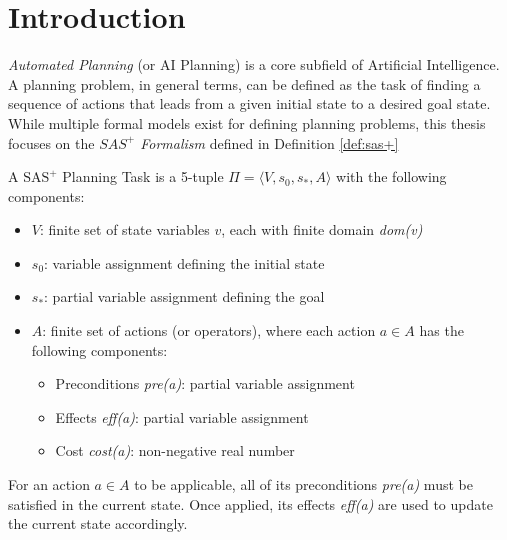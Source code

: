 \chapter{Introduction}
\label{ch:intro}
\textit{Automated Planning} (or AI Planning) is a core subfield of Artificial Intelligence.
A planning problem, in general terms, can be defined as the task of finding a sequence
of actions that leads from a given initial state to a desired goal state.
While multiple formal models exist for defining planning problems, this thesis
focuses on the \textit{$SAS^+$ Formalism} defined in Definition \ref{def:sas+}

\begin{definition}
	\label{def:sas+}
	A $\text{SAS}^+$ Planning Task is a 5-tuple $\Pi = \langle V, s_0, s_*, A \rangle$ with
	the following components:
	\begin{itemize}
		\item \(V\): finite set of state variables \(v\),
		      each with finite domain \textit{dom(v)}
		\item \(s_0\): variable assignment defining the initial state
		\item \(s_*\): partial variable assignment defining the goal
		\item \(A\): finite set of actions (or operators),
		      where each action $a \in A$ has the following components:
		      \begin{itemize}
			      \item Preconditions \textit{pre(a)}: partial variable assignment
			      \item Effects \textit{eff(a)}: partial variable assignment
			      \item Cost \textit{cost(a)}: non-negative real number
		      \end{itemize}
	\end{itemize}
\end{definition}

For an action $a \in A$ to be applicable, all of its preconditions
\textit{pre(a)} must be satisfied in the current state. Once applied, its effects
\textit{eff(a)} are used to update the current state accordingly.

